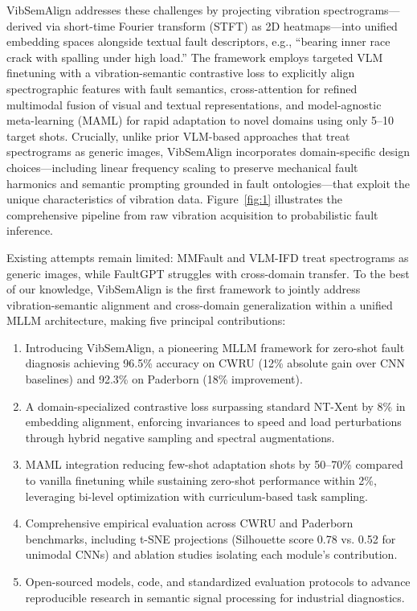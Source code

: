VibSemAlign addresses these challenges by projecting vibration spectrograms—derived via short-time Fourier transform (STFT) as 2D heatmaps—into unified embedding spaces alongside textual fault descriptors, e.g., ``bearing inner race crack with spalling under high load.'' The framework employs targeted VLM finetuning with a vibration-semantic contrastive loss to explicitly align spectrographic features with fault semantics, cross-attention for refined multimodal fusion of visual and textual representations, and model-agnostic meta-learning (MAML) for rapid adaptation to novel domains using only 5--10 target shots. Crucially, unlike prior VLM-based approaches that treat spectrograms as generic images, VibSemAlign incorporates domain-specific design choices—including linear frequency scaling to preserve mechanical fault harmonics and semantic prompting grounded in fault ontologies—that exploit the unique characteristics of vibration data. Figure~\ref{fig:1} illustrates the comprehensive pipeline from raw vibration acquisition to probabilistic fault inference.

Existing attempts remain limited: MMFault \cite{cite23} and VLM-IFD \cite{cite24} treat spectrograms as generic images, while FaultGPT \cite{cite26} struggles with cross-domain transfer. To the best of our knowledge, VibSemAlign is the first framework to jointly address vibration-semantic alignment and cross-domain generalization within a unified MLLM architecture, making five principal contributions:
\begin{enumerate}
\item Introducing VibSemAlign, a pioneering MLLM framework for zero-shot fault diagnosis achieving 96.5\% accuracy on CWRU (12\% absolute gain over CNN baselines) and 92.3\% on Paderborn (18\% improvement).
\item A domain-specialized contrastive loss surpassing standard NT-Xent by 8\% in embedding alignment, enforcing invariances to speed and load perturbations through hybrid negative sampling and spectral augmentations.
\item MAML integration reducing few-shot adaptation shots by 50--70\% compared to vanilla finetuning while sustaining zero-shot performance within 2\%, leveraging bi-level optimization with curriculum-based task sampling.
\item Comprehensive empirical evaluation across CWRU and Paderborn benchmarks, including t-SNE projections (Silhouette score 0.78 vs. 0.52 for unimodal CNNs) and ablation studies isolating each module's contribution.
\item Open-sourced models, code, and standardized evaluation protocols to advance reproducible research in semantic signal processing for industrial diagnostics.
\end{enumerate}

